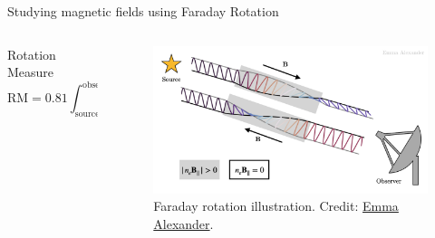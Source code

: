 \documentclass[xetex,aspectratio=169]{beamer}
\begin{document}
\begin{frame}{Studying magnetic fields using Faraday Rotation}
	\footnotesize
	\begin{columns}

		\begin{column}{0.55\textwidth}



			\begin{block}{Rotation Measure}
				\begin{equation*}
					\text{RM} = 0.81 \int_{\text{source}}^{\text{observer}} n_e(r) B_{||}(r) \cdot dr\; \text{rad}\;\text{m}^{-2}
				\end{equation*}
			\end{block}

		\end{column}

		\begin{column}{0.45\textwidth}
			\begin{figure}
				\centering
				\includegraphics[width=\textwidth]{figures/faraday_rot.png}
				\caption*{Faraday rotation illustration. Credit: \href{https://emmaalexander.github.io/resources.html}{Emma Alexander}.}
			\end{figure}
		\end{column}
	\end{columns}

\end{frame}
\end{document}
